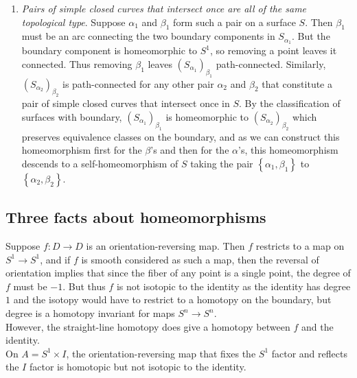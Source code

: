 \documentclass[reqno]{amsart}
\theoremstyle{definition}
\theoremstyle{remark}
\begin{document}
\begin{enumerate}
    \item \textit{Pairs of simple closed curves that intersect
        once are all of the same topological type}.
        Suppose $\alpha_1$ and $\beta_1$ form
        such a pair on a surface $S$. Then
        $\beta_1$ must be an arc connecting the two
        boundary components in $S_{\alpha_1}$. But the boundary
        component is homeomorphic to $S^{1}$, so removing a 
        point leaves it connected. Thus removing
        $\beta_1$ leaves $\left( S_{\alpha_1} \right)_{\beta_1}$
        path-connected. Similarly,
        $\left( S_{\alpha_2} \right)_{\beta_2}$ is path-connected
        for any other pair $\alpha_2$ and $\beta_2$ that
        constitute a pair of simple closed curves
        that intersect once in $S$. By the classification
        of surfaces with boundary, $\left( S_{\alpha_1} \right)_{\beta_1}$ is
        homeomorphic to $\left( S_{\alpha_2} \right)_{\beta_2}$ 
        which preserves equivalence classes on the boundary,
        and as we can construct this homeomorphism first
        for the $\beta$'s and then for the $\alpha$'s, 
        this homeomorphism descends to a self-homeomorphism
        of $S$ taking the pair $\left\{ \alpha_1, \beta_1 \right\} $ 
        to $\left\{ \alpha_2, \beta_2 \right\} $.
\end{enumerate}


\subsection{Three facts about homeomorphisms}

Suppose $f \colon D \to D$ is an orientation-reversing map.
Then $f$ restricts to a map on $S^{1} \to S^{1}$, and
if $f$ is smooth considered as such a map, then the
reversal of orientation implies that since the fiber
of any point is a single point, the degree of $f$ 
must be $-1$. But thus $f$ is not isotopic to the identity
as the identity has degree $1$ and the isotopy would
have to restrict to a homotopy on the boundary, but
degree is a homotopy invariant for maps $S^{n} \to S^{n}$.\\
However, the straight-line homotopy does give a homotopy
between $f$ and the identity.\\
\linebreak
On $A = S^{1} \times I$, the orientation-reversing map
that fixes the $S^{1}$ factor and reflects the $I$ factor
is homotopic but not isotopic to the identity.
\end{document}
